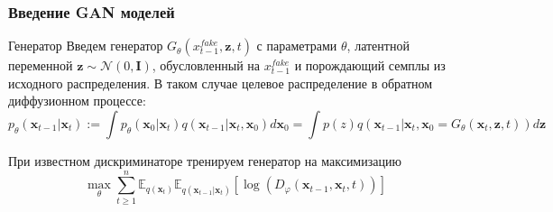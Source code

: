 \documentclass[8pt]{beamer}
\begin{document}
\begin{frame}
	\frametitle{Введение GAN моделей}		
	\begin{block}{Генератор}
		Введем генератор $G_\theta(x_{t-1}^{fake}, \textbf{z}, t)$ с параметрами $\theta$, латентной переменной $\textbf{z}\sim \mathcal{N}(0, \textbf{I})$, обусловленный на $x_{t-1}^{fake}$ и порождающий семплы из исходного распределения. В таком случае целевое распределение в обратном диффузионном процессе:
		$$p_\theta(\textbf{x}_{t-1}|\textbf{x}_t) := \int p_\theta(\textbf{x}_0|\textbf{x}_t)q(\textbf{x}_{t-1}|\textbf{x}_t, \textbf{x}_0)d\textbf{x}_0 =\int p(z)q(\textbf{x}_{t-1}|\textbf{x}_t, \textbf{x}_0 = G_\theta(\textbf{x}_t, \textbf{z}, t))d\textbf{z}$$
	\end{block}
		При известном дискриминаторе тренируем генератор на максимизацию 
		\begin{equation*}
			\max\limits_\theta\sum\limits_{t\geqslant 1}^n \mathbb{E}_{q(\textbf{x}_t)}\mathbb{E}_{q(\textbf{x}_{t-1}|\textbf{x}_t)}[\log{(D_\varphi(\textbf{x}_{t-1}, \textbf{x}_t, t))}]
		\end{equation*}

\end{frame}
\end{document}
